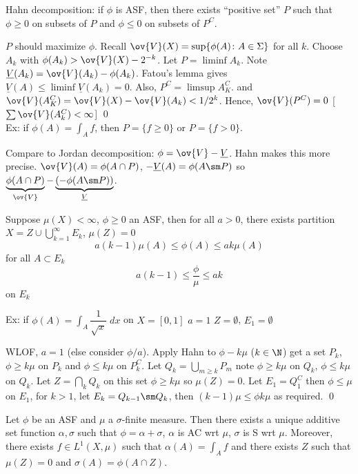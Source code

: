 Hahn decomposition: if $\phi$ is ASF, then there exists ``positive set'' $P$ such that $\phi \geq 0$ on subsets of $P$ and $\phi \leq 0$ on subsets of $P^C$.

\pf $P$ should maximize $\phi$. Recall $\ov{V}(X)= \sup \{ \phi(A) \colon A \in \Sigma\}$ for all $k$. Choose $A_k$ with $\phi(A_k) > \ov{V}(X) - 2^{-k}$. Let $P= \liminf A_k$. Note $\underline{V}(A_k)= \ov{V}(A_k) - \phi(A_k)$. Fatou's lemma gives $\underline{V}(A) \leq \liminf \underline{V}(A_k)= 0$. Also, $P^C= \limsup A_K^C$. and $\ov{V}(A_K^C)= \ov{V}(X) - \ov{V}(A_k)< 1/2^k$. Hence, $\ov{V}(P^C)=0$ [$\sum \ov{V}(A_k^C)<\infty$] \qed \\


Ex: if $\phi(A)= \int_A f$, then $P= \{ f \geq 0 \}$ or $P=\{ f>0 \}$. 

Compare to Jordan decomposition: $\phi= \ov{V} - \underline{V}$. Hahn makes this more precise. $\ov{V}(A)= \phi(A \cap P)$, $-\underline{V}(A)= \phi(A \sm P)$ so $\underbrace{\phi(A \cap P)}_{\ov{V}} - \underbrace{(- \phi(A \sm P))}_{\underline{V}}$.


\begin{lem}
Suppose $\mu(X)< \infty$, $\phi \geq 0$ an ASF, then for all $a>0$, there exists partition $X= Z \cup \bigcup_{k=1}^\infty E_k$, $\mu(Z)=0$
	\[
	a(k-1) \mu(A) \leq \phi(A) \leq a k \mu(A)
	\]
for all $A \subset E_k$
	\[
	a(k-1) \leq \dfrac{\phi}{\mu} \leq ak
	\]
on $E_k$
\end{lem}


Ex: if $\phi(A) = \int_A \dfrac{1}{\sqrt{x}} \; dx$ on $X=[0,1]$ $a=1$ $Z= \emptyset$, $E_1= \emptyset$


\pf WLOF, $a=1$ (else consider $\phi/a$). Apply Hahn to $\phi - k \mu$ ($k \in \N$) get a set $P_k$, $\phi \geq k \mu$ on $P_k$ and $\phi \leq k \mu$ on $P_k^C$. Let $Q_k= \bigcup_{m \geq k} P_m$ note $\phi \geq k \mu$ on $Q_k$, $\phi \leq k \mu$ on $Q_k$. Let $Z= \bigcap_k Q_k$ on this set $\phi \geq k \mu$ so $\mu(Z)=0$. Let $E_1= Q_1^C$ then $\phi \leq \mu$ on $E_1$, for $k>1$, let $E_k = Q_{k-1} \sm Q_k$, then $(k-1) \mu \leq \phi k \mu$ as required. \qed \\



\begin{thm}
Let $\phi$ be an ASF and $\mu$ a $\sigma$-finite measure. Then there exists a unique additive set function $\alpha,\sigma$ such that $\phi = \alpha + \sigma$, $\alpha$ is AC wrt $\mu$, $\sigma$ is S wrt $\mu$. Moreover, there exists $f \in L^1(X,\mu)$ such that $\alpha(A)= \int_A f$ and there exists $Z$ such that $\mu(Z)=0$ and $\sigma(A)= \phi(A \cap Z)$.
\end{thm}

